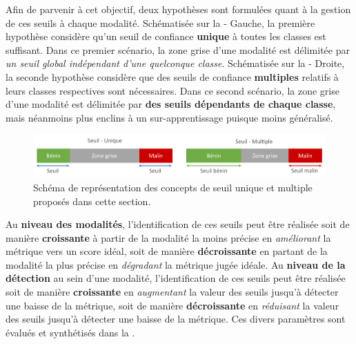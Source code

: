 Afin de parvenir à cet objectif, deux hypothèses sont formulées quant à la gestion de ces seuils à chaque modalité.  Schématisée sur la  - Gauche, la première hypothèse considère qu'un seuil de confiance \textbf{unique} à toutes les classes est suffisant. Dans ce premier scénario, la zone grise d'une modalité est délimitée par \textit{un seuil global indépendant d'une quelconque classe}. Schématisée sur la  - Droite, la seconde hypothèse considère que des seuils de confiance \textbf{multiples} relatifs à leurs classes respectives sont nécessaires. Dans ce second scénario, la zone grise d'une modalité est délimitée par \textbf{des seuils dépendants de chaque classe}, mais néanmoins plus enclins à un sur-apprentissage puisque moins généralisé.\par

\begin{figure}[H]
    \centering
    \includegraphics[width=\linewidth]{contents/chapter_8/resources/scheme_multimodal_treshold.pdf}
    \caption{Schéma de représentation des concepts de seuil unique et multiple proposés dans cette section.}
    \label{fig:scheme_multimodal_treshold}
\end{figure}\par

Au \textbf{niveau des modalités}, l'identification de ces seuils peut être réalisée soit de manière \textbf{croissante} à partir de la modalité la moins précise en \textit{améliorant} la métrique vers un score idéal, soit de manière \textbf{décroissante} en partant de la modalité la plus précise en \textit{dégradant} la métrique jugée idéale. Au \textbf{niveau de la détection} au sein d'une modalité, l'identification de ces seuils peut être réalisée soit de manière \textbf{croissante} en \textit{augmentant} la valeur des seuils jusqu'à détecter une baisse de la métrique, soit de manière \textbf{décroissante} en \textit{réduisant} la valeur des seuils jusqu'à détecter une baisse de la métrique. Ces divers paramètres sont évalués et synthétisés dans la .\par

